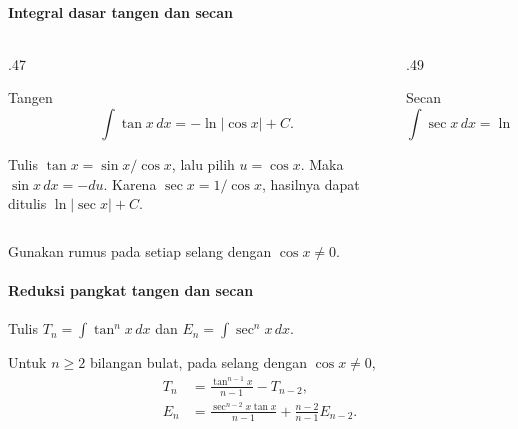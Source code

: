 \documentclass{../../kalkulus-ppt}
\begin{document}
\begin{frame}{\insertsection}
    \framesubtitle{Integral dasar tangen dan secan}
    \begin{columns}[t,onlytextwidth]
        \begin{column}{.47\textwidth}
            \begin{block}{Tangen}
                \[
                    \int\tan x\,dx=-\ln|\cos x|+C.
                \]
            \end{block}
            Tulis $\tan x=\sin x/\cos x$, lalu pilih $u=\cos x$.
            Maka $\sin x\,dx=-du$. Karena $\sec x=1/\cos x$, hasilnya
            dapat ditulis $\ln|\sec x|+C$.
        \end{column}
        \begin{column}{.49\textwidth}
            \begin{block}{Secan}
                \[
                    \int\sec x\,dx=\ln|\sec x+\tan x|+C.
                \]
            \end{block}
        \end{column}
    \end{columns}
    Gunakan rumus pada setiap selang dengan $\cos x\ne0$.
\end{frame}

\begin{frame}{\insertsection}
    \framesubtitle{Reduksi pangkat tangen dan secan}
    Tulis $T_n=\int\tan^n x\,dx$ dan $E_n=\int\sec^n x\,dx$.
    \begin{teorema}
        Untuk $n\ge2$ bilangan bulat, pada selang dengan $\cos x\ne0$,
        \[
            \begin{aligned}
                T_n&=\frac{\tan^{n-1}x}{n-1}-T_{n-2},\\
                E_n&=\frac{\sec^{n-2}x\tan x}{n-1}+\frac{n-2}{n-1}E_{n-2}.
            \end{aligned}
        \]
    \end{teorema}
\end{frame}
\end{document}
